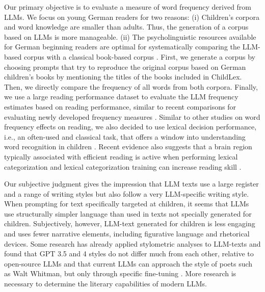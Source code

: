 \documentclass[jou, a4paper]{apa7}
\begin{document}
Our primary objective is to evaluate a measure of word frequency derived from LLMs. We focus on young German readers for two reasons: (i) Children's corpora and word knowledge are smaller than adults. Thus, the generation of a corpus based on LLMs is more manageable. (ii) The psycholinguistic resources available for German beginning readers are optimal for systematically comparing the LLM-based corpus with a classical book-based corpus \citep[ChildLex;][]{schroeder_childlex_2015}. First, we generate a corpus by choosing prompts that try to reproduce the original corpus based on German children's books by mentioning the titles of the books included in ChildLex. Then, we directly compare the frequency of all words from both corpora. Finally, we use a large reading performance dataset \citep[DeveL;][]{schroter_developmental_2017} to evaluate the LLM frequency estimates based on reading performance, similar to recent comparisons for evaluating newly developed frequency measures \citep[e.g.,][]{brysbaert_word_2011, brysbaert_word_2018}. Similar to other studies on word frequency effects on reading, we also decided to use lexical decision performance, i.e., an often-used and classical task, that offers a window into understanding word recognition in children \citep{davies_reading_2017, monster_word_2022, van_den_boer_lexical_2012}. Recent evidence also suggests that a brain region typically associated with efficient reading \citep{dehaene_unique_2011} is active when performing lexical categorization \citep{gagl_lexical_2022} and lexical categorization training can increase reading skill \citep{gagl_investigating_2023}.

Our subjective judgment gives the impression that LLM texts use a large register and a range of writing styles but also follow a very LLM-specific writing style. When prompting for text specifically targeted at children, it seems that LLMs use structurally simpler language than used in texts not specially generated for children. Subjectively, however, LLM-text generated for children is less engaging and uses fewer narrative elements, including figurative language and rhetorical devices. Some research has already applied stylometric analyses to LLM-texts and found that GPT 3.5 and 4 styles do not differ much from each other, relative to open-source LLMs \citep{kumarage_neural_2023} and that current LLMs can approach the style of poets such as Walt Whitman, but only through specific fine-tuning \citep{sawicki_bits_2023}. More research is necessary to determine the literary capabilities of modern LLMs.  
\end{document}
